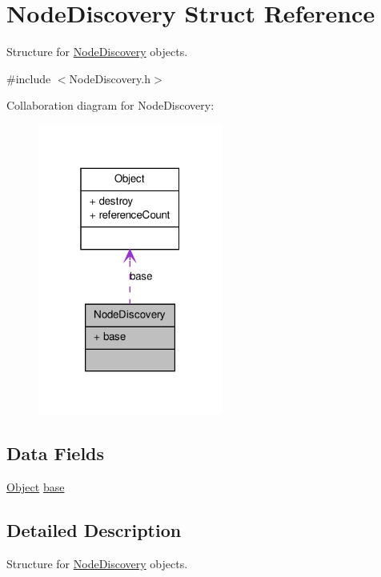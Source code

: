 \hypertarget{struct_node_discovery}{
\section{NodeDiscovery Struct Reference}
\label{struct_node_discovery}
}


Structure for \hyperlink{struct_node_discovery}{NodeDiscovery} objects.  




{\ttfamily \#include $<$NodeDiscovery.h$>$}



Collaboration diagram for NodeDiscovery:\nopagebreak
\begin{figure}[H]
\begin{center}
\leavevmode
\includegraphics[width=172pt]{struct_node_discovery__coll__graph}
\end{center}
\end{figure}
\subsection*{Data Fields}
\begin{DoxyCompactItemize}
\item 
\hyperlink{struct_object}{Object} \hyperlink{struct_node_discovery_a23cf4ef56ba22bed625eab08d6361fa7}{base}
\end{DoxyCompactItemize}


\subsection{Detailed Description}
Structure for \hyperlink{struct_node_discovery}{NodeDiscovery} objects. 

